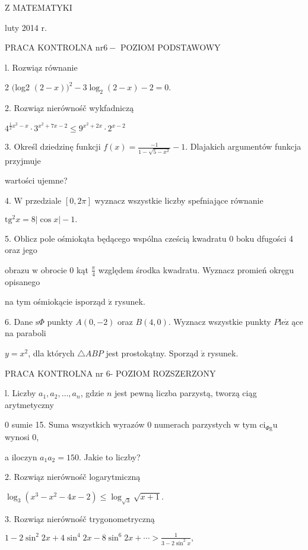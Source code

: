 \documentclass[a4paper,12pt]{article}
\begin{document}
Z MATEMATYKI

luty 2014 r.

PRACA KONTROLNA $\mathrm{n}\mathrm{r} 6-$ POZIOM PODSTAWOWY

l. Rozwiąz równanie

2 $($log2 $(2-x))^{2}-3\log_{2}(2-x)-2=0.$

2. Rozwiąz nierównośč wykfadniczą

$4^{\frac{1}{2}x^{2}-x}\cdot 3^{x^{2}+7x-2}\leq 9^{x^{2}+2x}\cdot 2^{x-2}$

3. Określ dziedzinę funkcji $f(x)=\displaystyle \frac{-1}{1-\sqrt{5-x^{2}}}-1$. Dlajakich argumentów funkcja przyjmuje

wartości ujemne?

4. $\mathrm{W}$ przedziale $[0,2\pi]$ wyznacz wszystkie liczby spefniające równanie

$\mathrm{t}\mathrm{g}^{2}x=8|\cos x|-1.$

5. Oblicz pole ośmiokąta będącego wspólna cześcią kwadratu $0$ boku dfugości 4 oraz jego

obrazu $\mathrm{w}$ obrocie $0$ kąt $\displaystyle \frac{\pi}{4}$ względem środka kwadratu. Wyznacz promień okręgu opisanego

na tym ośmiokącie $\mathrm{i}\mathrm{s}$porząd $\acute{\mathrm{z}}$ rysunek.

6. Dane $\mathrm{s}\Phi$ punkty $A(0,-2)$ oraz $B(4,0)$. Wyznacz wszystkie punkty $P\mathrm{l}\mathrm{e}\dot{\mathrm{z}}$ ące na paraboli

$y=x^{2}$, dla których $\triangle ABP$ jest prostokątny. Sporząd $\acute{\mathrm{z}}$ rysunek.





PRACA KONTROLNA nr 6- POZIOM ROZSZERZONY

l. Liczby $a_{1}, a_{2}, \ldots, a_{n}$, gdzie $n$ jest pewną liczba parzystą, tworzą ciąg arytmetyczny

$0$ sumie 15. Suma wszystkich wyrazów $0$ numerach parzystych $\mathrm{w}$ tym $\mathrm{c}\mathrm{i}_{\Phi \mathrm{g}}\mathrm{u}$ wynosi 0,

a iloczyn $a_{1}a_{2}=150$. Jakie to liczby?

2. Rozwiąz nierównośč logarytmiczną

$\log_{3}(x^{3}-x^{2}-4x-2)\leq\log_{\sqrt{3}}\sqrt{x+1}.$

3. Rozwiąz nierównośč trygonometryczną

$1-2\displaystyle \sin^{2}2x+4\sin^{4}2x-8\sin^{6}2x+\cdots>\frac{1}{3-2\sin^{2}x},$
\end{document}
